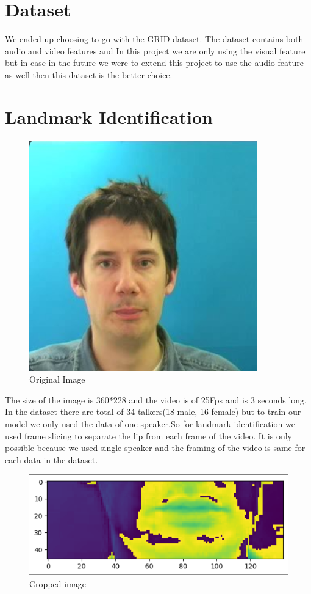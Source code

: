         \section{Dataset}
        We ended up choosing to go with the GRID dataset. The dataset contains both audio and video features and 
        In this project we are only using the visual feature but in case in the future we were to extend this project to use the audio feature as well then this dataset is the better choice.
        
       \section{Landmark Identification}
       \begin{figure}[h]
	\centering
	\includegraphics[width=0.4\linewidth]{img/face.png}
	\caption{Original Image}
	
	\end{figure}
 The size of the image is 360*228 and the video is of 25Fps and is 3 seconds long. In the dataset there are total of 34 talkers(18 male, 16 female) but to train our model we only used the data of one speaker.So for landmark identification we used frame slicing to separate the lip from each frame of the video. It is only possible because we used single speaker and the framing of the video is same for each data in the dataset.


 
       \begin{figure}[h]
	\centering
	\includegraphics[width=0.6\linewidth]{img/cropped.png}
	\caption{Cropped image}
	
	\end{figure}
    \pagebreak
    
